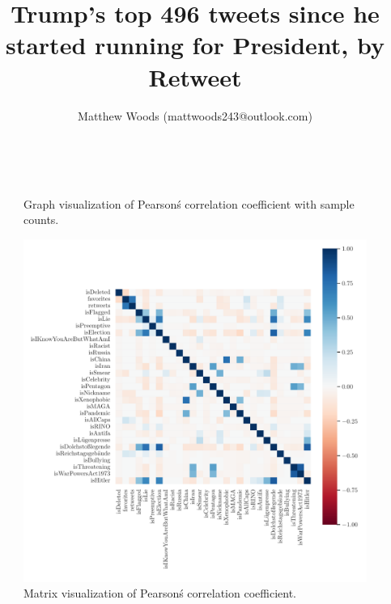 \documentclass{article}
\begin{document}
    \title{Trump's top 496 tweets since he started running for President, by Retweet}
    \author{Matthew Woods (mattwoods243@outlook.com)}
    \
    \maketitle
    \begin{figure}
         \hspace{-1.5cm}
         
         \caption{Graph visualization of Pearson\'s correlation coefficient with sample counts.}
    \end{figure}
 
    \begin{figure}
         \vspace{-4cm}
         \hspace{-3cm}
         \includegraphics[scale=.8]{corr_heatmap.pdf}
         \caption{Matrix visualization of Pearson\'s correlation coefficient.}
    \end{figure}
   
    
    
\end{document}
